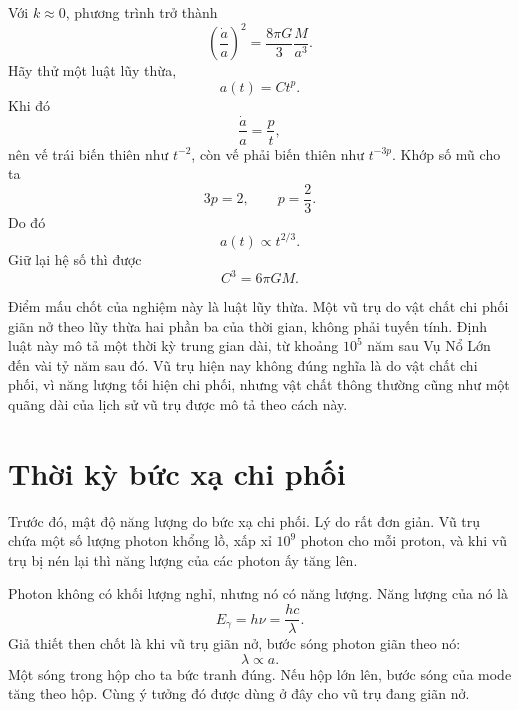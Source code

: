 Với \(k\approx 0\), phương trình trở thành
\begin{equation}
\left(\frac{\dot a}{a}\right)^2=\frac{8\pi G}{3}\frac{M}{a^3}.
\end{equation}
Hãy thử một luật lũy thừa,
\begin{equation}
a(t)=Ct^p.
\end{equation}
Khi đó
\begin{equation}
\frac{\dot a}{a}=\frac{p}{t},
\end{equation}
nên vế trái biến thiên như \(t^{-2}\), còn vế phải biến thiên như \(t^{-3p}\). Khớp số mũ cho ta
\begin{equation}
3p=2,
\qquad
p=\frac{2}{3}.
\end{equation}
Do đó
\begin{equation}
a(t)\propto t^{2/3}.
\end{equation}
Giữ lại hệ số thì được
\begin{equation}
C^3=6\pi G M.
\end{equation}

Điểm mấu chốt của nghiệm này là luật lũy thừa. Một vũ trụ do vật chất chi phối giãn nở theo lũy thừa hai phần ba của thời gian, không phải tuyến tính. Định luật này mô tả một thời kỳ trung gian dài, từ khoảng \(10^5\) năm sau Vụ Nổ Lớn đến vài tỷ năm sau đó. Vũ trụ hiện nay không đúng nghĩa là do vật chất chi phối, vì năng lượng tối hiện chi phối, nhưng vật chất thông thường cũng như một quãng dài của lịch sử vũ trụ được mô tả theo cách này.

\section{Thời kỳ bức xạ chi phối}

Trước đó, mật độ năng lượng do bức xạ chi phối. Lý do rất đơn giản. Vũ trụ chứa một số lượng photon khổng lồ, xấp xỉ \(10^9\) photon cho mỗi proton, và khi vũ trụ bị nén lại thì năng lượng của các photon ấy tăng lên.

Photon không có khối lượng nghỉ, nhưng nó có năng lượng. Năng lượng của nó là
\begin{equation}
E_\gamma=h\nu=\frac{hc}{\lambda}.
\end{equation}
Giả thiết then chốt là khi vũ trụ giãn nở, bước sóng photon giãn theo nó:
\begin{equation}
\lambda\propto a.
\end{equation}
Một sóng trong hộp cho ta bức tranh đúng. Nếu hộp lớn lên, bước sóng của mode tăng theo hộp. Cùng ý tưởng đó được dùng ở đây cho vũ trụ đang giãn nở.

